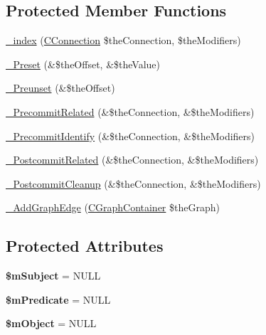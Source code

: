 \subsection*{Protected Member Functions}
\begin{DoxyCompactItemize}
\item 
\hyperlink{class_c_ontology_edge_a8e5d17a08008ca21f0be3ffd801890ef}{\-\_\-index} (\hyperlink{class_c_connection}{C\-Connection} \$the\-Connection, \$the\-Modifiers)
\item 
\hyperlink{class_c_ontology_edge_a001291e06296d03d90254b063581b3f9}{\-\_\-\-Preset} (\&\$the\-Offset, \&\$the\-Value)
\item 
\hyperlink{class_c_ontology_edge_adfb3c6b7fe4fd70f465a225ebb605565}{\-\_\-\-Preunset} (\&\$the\-Offset)
\item 
\hyperlink{class_c_ontology_edge_ad014041738697d960791d7ee489dcc26}{\-\_\-\-Precommit\-Related} (\&\$the\-Connection, \&\$the\-Modifiers)
\item 
\hyperlink{class_c_ontology_edge_ac76cb6503b256fa7f6599a1cd98ab5cd}{\-\_\-\-Precommit\-Identify} (\&\$the\-Connection, \&\$the\-Modifiers)
\item 
\hyperlink{class_c_ontology_edge_a489c9ec3268156e7bef68eccec679fa5}{\-\_\-\-Postcommit\-Related} (\&\$the\-Connection, \&\$the\-Modifiers)
\item 
\hyperlink{class_c_ontology_edge_a416c0d2e9e040ae28b1cf05ff6bbd947}{\-\_\-\-Postcommit\-Cleanup} (\&\$the\-Connection, \&\$the\-Modifiers)
\item 
\hyperlink{class_c_ontology_edge_acc6425bab1f7e9988b1be0cfc977533e}{\-\_\-\-Add\-Graph\-Edge} (\hyperlink{class_c_graph_container}{C\-Graph\-Container} \$the\-Graph)
\end{DoxyCompactItemize}
\subsection*{Protected Attributes}
\begin{DoxyCompactItemize}
\item 
\hypertarget{class_c_ontology_edge_a6b69e9b2597ea1ca7d07dd54e2c40ae2}{{\bfseries \$m\-Subject} = N\-U\-L\-L}\label{class_c_ontology_edge_a6b69e9b2597ea1ca7d07dd54e2c40ae2}

\item 
\hypertarget{class_c_ontology_edge_a8b596151b0cf3a60aad60bc1e7cfec7d}{{\bfseries \$m\-Predicate} = N\-U\-L\-L}\label{class_c_ontology_edge_a8b596151b0cf3a60aad60bc1e7cfec7d}

\item 
\hypertarget{class_c_ontology_edge_a3ba70a64095979da7533fb6124ec49b7}{{\bfseries \$m\-Object} = N\-U\-L\-L}\label{class_c_ontology_edge_a3ba70a64095979da7533fb6124ec49b7}

\end{DoxyCompactItemize}


